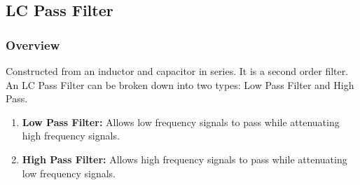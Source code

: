 \subsection{LC Pass Filter}

\subsubsection{Overview}
Constructed from an inductor and capacitor in series. It
is a second order filter. An LC Pass Filter can be broken
down into two types: Low Pass Filter and High Pass.
\begin{enumerate}
  \item \textbf{Low Pass Filter:} Allows low frequency
    signals to pass while attenuating high frequency signals.
  \item \textbf{High Pass Filter:} Allows high frequency
    signals to pass while attenuating low frequency signals.
\end{enumerate}

